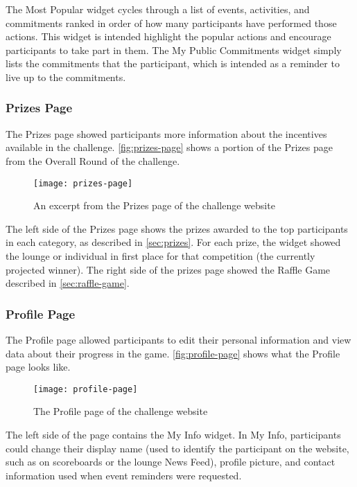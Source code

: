 The Most Popular widget cycles through a list of events, activities, and commitments ranked in order of how many participants have performed those actions. This widget is intended highlight the popular actions and encourage participants to take part in them. The My Public Commitments widget simply lists the commitments that the participant, which is intended as a reminder to live up to the commitments.


\subsubsection{Prizes Page}

The Prizes page showed participants more information about the incentives available in the challenge. \autoref{fig:prizes-page} shows a portion of the Prizes page from the Overall Round of the challenge.

\begin{figure}[htbp]
	\centering
		\texttt{[image: prizes-page]}
		\caption{An excerpt from the Prizes page of the challenge website}
\label{fig:prizes-page}
\end{figure}

The left side of the Prizes page shows the prizes awarded to the top participants in each category, as described in \autoref{sec:prizes}. For each prize, the widget showed the lounge or individual in first place for that competition (the currently projected winner). The right side of the prizes page showed the Raffle Game described in \autoref{sec:raffle-game}.


\subsubsection{Profile Page}

The Profile page allowed participants to edit their personal information and view data about their progress in the game. \autoref{fig:profile-page} shows what the Profile page looks like.

\begin{figure}[htbp]
	\centering
		\texttt{[image: profile-page]}
		\caption{The Profile page of the challenge website}
\label{fig:profile-page}
\end{figure}

The left side of the page contains the My Info widget. In My Info, participants could change their display name (used to identify the participant on the website, such as on scoreboards or the lounge News Feed), profile picture, and contact information used when event reminders were requested.

